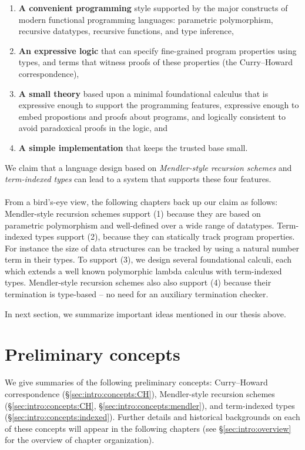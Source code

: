 \begin{enumerate}[(1)]
 \item \textbf{A convenient programming} style
         supported by the major constructs of
         modern functional programming languages: 
         parametric polymorphism, recursive datatypes,
         recursive functions, and type inference,
 \item \textbf{An expressive logic}
         that can specify fine-grained program properties using types, and terms that
         witness proofs of these properties 
         (the Curry--Howard correspondence),
 \item \textbf{A small theory} based upon a minimal foundational calculus that is
         expressive enough to support the programming features, expressive
         enough to embed propostions and proofs about
         programs, and logically consistent
         to avoid paradoxical proofs in the logic, and
 \item \textbf{A simple implementation} that keeps the trusted base small.
\end{enumerate}
We claim that a language design based on \emph{Mendler-style recursion schemes}
and \emph{term-indexed types} can lead to a system that supports these four
features.

\paragraph{}
From a bird's-eye view, the following chapters back up our claim as follows:
Mendler-style recursion schemes support (1) because they are based on
parametric polymorphism and well-defined over a wide range of datatypes.
Term-indexed types support (2), because they can statically track program
properties. For instance the size of data structures can be tracked by using
a natural number term in their types.
To support (3), we design several foundational calculi, each which extends
a well known polymorphic lambda calculus with term-indexed types.
Mendler-style recursion schemes also also support (4) because their
termination is type-based -- no need for an auxiliary termination checker.

In next section, we summarize important ideas mentioned in our thesis above.

\section{Preliminary concepts}\label{sec:intro:concepts}
We give summaries of the following preliminary concepts:
Curry--Howard correspondence (\S\ref{sec:intro:concepts:CH}),
Mendler-style recursion schemes
(\S\ref{sec:intro:concepts:CH}, \S\ref{sec:intro:concepts:mendler}),
and term-indexed types (\S\ref{sec:intro:concepts:indexed}).
Further details and historical backgrounds on each of these concepts
will appear in the following chapters (see \S\ref{sec:intro:overview}
for the overview of chapter organization).

